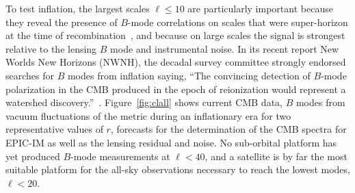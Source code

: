 To test inflation, the largest scales $\ell \leq 10$ are particularly important because they reveal the presence of $B$-mode correlations on scales that were super-horizon at the time of recombination~\cite{Lee:2014cya}, 
and because on large scales the signal is strongest relative to the lensing $B$ mode and instrumental noise.
In its recent report New Worlds New Horizons (NWNH), the decadal survey committee strongly endorsed searches for $B$ modes from inflation saying, ``The convincing detection of $B$-mode polarization in the CMB produced in the epoch of reionization would represent a watershed discovery.''~\cite{blandford2010}. 
 Figure~\ref{fig:clall} shows current CMB data, $B$ modes from vacuum fluctuations of the metric during an inflationary era for two representative values of $r$, forecasts for the determination of the \ac{CMB} spectra for EPIC-IM as well as the lensing residual and noise.
No sub-orbital platform has yet produced $B$-mode measurements at $\ell< 40$, and a satellite is by far the most suitable platform for the all-sky observations necessary to reach the lowest modes, $\ell<20$. 
